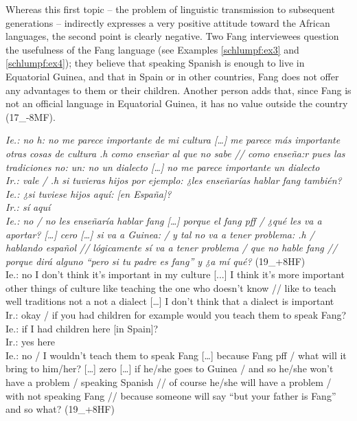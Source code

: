 \documentclass[output=paper]{langscibook}
\begin{document}
Whereas this first topic – the problem of linguistic transmission to subsequent generations – indirectly expresses a very positive attitude toward the African languages, the second point is clearly negative. Two Fang interviewees question the usefulness of the Fang language (see Examples \ref{schlumpf:ex3} and \ref{schlumpf:ex4}); they believe that speaking Spanish is enough to live in Equatorial Guinea, and that in Spain or in other countries, Fang does not offer any advantages to them or their children. Another person adds that, since Fang is not an official language in Equatorial Guinea, it has no value outside the country (17\_-8MF).

\begin{exe}\ex\label{schlumpf:ex3}
	\textit{Ie.: no h: no me parece importante de mi cultura […] me parece más importante otras cosas de cultura .h como enseñar al que no sabe // como enseña:r pues las tradiciones no: un: no un dialecto […] no me parece importante un dialecto\\
Ir.: vale / .h si tuvieras hijos por ejemplo: ¿les enseñarías hablar fang también?\\
Ie.: ¿si tuviese hijos aquí: [en España]?\\
Ir.: sí aquí\\
Ie.: no / no les enseñaría hablar fang […] porque el fang pff / ¿qué les va a aportar? […] cero […] si va a Guinea: / y tal no va a tener problema: .h / hablando español // lógicamente sí va a tener problema / que no hable fang // porque dirá alguno “pero si tu padre es fang” y ¿a mí qué?} (19\_+8HF)\\
Ie.: no I don’t think it’s important in my culture [...] I think it’s more important other things of culture like teaching the one who doesn’t know // like to teach well traditions not a not a dialect […] I don’t think that a dialect is important\\
Ir.: okay / if you had children for example would you teach them to speak Fang?\\
Ie.: if I had children here [in Spain]?\\
Ir.: yes here\\
Ie.: no / I wouldn’t teach them to speak Fang […] because Fang pff / what will it bring to him/her? […] zero […] if he/she goes to Guinea / and so he/she won’t have a problem / speaking Spanish // of course he/she will have a problem / with not speaking Fang // because someone will say “but your father is Fang” and so what? (19\_+8HF)


\end{exe}
\end{document}

